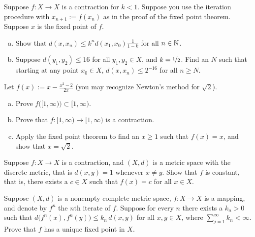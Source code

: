 \begin{exercise}
Suppose $f \colon X \to X$ is a contraction for $k < 1$.  Suppose you use the iteration
procedure with $x_{n+1} := f(x_n)$ as in the proof of the fixed point theorem.
Suppose $x$ is the fixed
point of $f$.
\begin{enumerate}[a)]
\item
Show that $d(x,x_n) \leq k^n d(x_1,x_0) \frac{1}{1-k}$ for all $n \in {\mathbb{N}}$.
\item
Suppose $d(y_1,y_2) \leq 16$ for all $y_1,y_2 \in X$, and $k=
\nicefrac{1}{2}$.  Find an $N$ such that starting at any point $x_0 \in X$, 
$d(x,x_n) \leq 2^{-16}$ for all $n \geq N$.
\end{enumerate}
\end{exercise}

\begin{exercise}
Let $f(x) := x-\frac{x^2-2}{2x}$ (you may recognize Newton's method for
$\sqrt{2}$).
\begin{enumerate}[a)]
\item
Prove $f\bigl([1,\infty)\bigr) \subset [1,\infty)$.
\item
Prove that $f \colon [1,\infty) \to [1,\infty)$ is a contraction.
\item
Apply the fixed point theorem to find an $x \geq 1$ such that
$f(x) = x$, and show that $x = \sqrt{2}$.
\end{enumerate}
\end{exercise}

\begin{exercise}
Suppose $f \colon X \to X$ is a contraction, and $(X,d)$ is a metric space
with the discrete metric, that is $d(x,y) = 1$ whenever $x \not= y$.
Show that $f$ is constant, that is,
there exists a $c \in X$ such that $f(x) = c$ for all $x \in X$.
\end{exercise}

\begin{exercise}
Suppose $(X,d)$ is a nonempty complete metric space,
$f \colon X \to X$ is a mapping, and denote
by $f^n$ the $n$th iterate of $f$.  Suppose
for every $n$ there exists a $k_n > 0$ such that
$d\bigl(f^n(x),f^n(y)\bigr) \leq k_n \, d(x,y)$
for all $x,y \in X$,
where $\sum_{j=1}^\infty k_n < \infty$.
Prove that $f$ has a unique fixed point in $X$.
\end{exercise}
